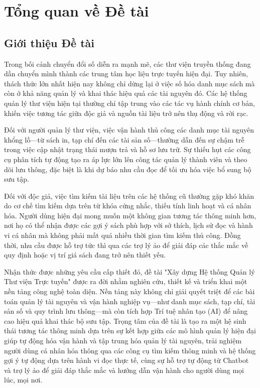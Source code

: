 \section{Tổng quan về Đề tài}

\subsection{Giới thiệu Đề tài}

Trong bối cảnh chuyển đổi số diễn ra mạnh mẽ, các thư viện truyền thống đang dần chuyển mình thành các trung tâm học liệu trực tuyến hiện đại. Tuy nhiên, thách thức lớn nhất hiện nay không chỉ dừng lại ở việc số hóa danh mục sách mà còn ở khả năng quản lý và khai thác hiệu quả các tài nguyên đó. Các hệ thống quản lý thư viện hiện tại thường chỉ tập trung vào các tác vụ hành chính cơ bản, khiến việc tương tác giữa độc giả và nguồn tài liệu trở nên thụ động và rời rạc.

Đối với người quản lý thư viện, việc vận hành thủ công các danh mục tài nguyên khổng lồ—từ sách in, tạp chí đến các tài sản số—thường dẫn đến sự chậm trễ trong việc cập nhật trạng thái mượn trả và hồ sơ lưu trữ. Sự thiếu hụt các công cụ phân tích tự động tạo ra áp lực lớn lên công tác quản lý thành viên và theo dõi lưu thông, đặc biệt là khi dự báo nhu cầu đọc để tối ưu hóa việc bổ sung bộ sưu tập.

Đối với độc giả, việc tìm kiếm tài liệu trên các hệ thống cũ thường gặp khó khăn do cơ chế tìm kiếm dựa trên từ khóa cứng nhắc, thiếu tính linh hoạt và cá nhân hóa. Người dùng hiện đại mong muốn một không gian tương tác thông minh hơn, nơi họ có thể nhận được các gợi ý sách phù hợp với sở thích, lịch sử đọc và hành vi cá nhân mà không phải mất quá nhiều thời gian tìm kiếm thủ công. Đồng thời, nhu cầu được hỗ trợ tức thì qua các trợ lý ảo để giải đáp các thắc mắc về quy định hoặc vị trí giá sách đang trở nên thiết yếu.

Nhận thức được những yêu cầu cấp thiết đó, đề tài "Xây dựng Hệ thống Quản lý Thư viện Trực tuyến" được ra đời nhằm nghiên cứu, thiết kế và triển khai một nền tảng công nghệ toàn diện. Nền tảng này không chỉ giải quyết triệt để các bài toán quản lý tài nguyên và vận hành nghiệp vụ—như danh mục sách, tạp chí, tài sản số và quy trình lưu thông—mà còn tích hợp Trí tuệ nhân tạo (AI) để nâng cao hiệu quả khai thác bộ sưu tập. Trọng tâm của đề tài là tạo ra một hệ sinh thái tương tác thông minh dựa trên sự kết hợp giữa các mô hình quản lý hiện đại giúp tự động hóa vận hành và tập trung hóa quản lý tài nguyên, trải nghiệm người dùng cá nhân hóa thông qua các công cụ tìm kiếm thông minh và hệ thống gợi ý tự động dựa trên hành vi đọc thực tế, cùng sự hỗ trợ tự động từ Chatbot và trợ lý ảo để giải đáp thắc mắc và hướng dẫn vận hành cho người dùng mọi lúc, mọi nơi.


